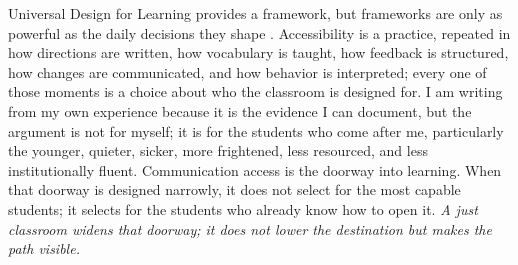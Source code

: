 \documentclass[11pt]{article}
\begin{document}
Universal Design for Learning provides a framework, but frameworks are only as powerful as the daily decisions they shape \citep{cast2024udl}. Accessibility is a practice, repeated in how directions are written, how vocabulary is taught, how feedback is structured, how changes are communicated, and how behavior is interpreted; every one of those moments is a choice about who the classroom is designed for. I am writing from my own experience because it is the evidence I can document, but the argument is not for myself; it is for the students who come after me, particularly the younger, quieter, sicker, more frightened, less resourced, and less institutionally fluent. Communication access is the doorway into learning. When that doorway is designed narrowly, it does not select for the most capable students; it selects for the students who already know how to open it. \textit{A just classroom widens that doorway; it does not lower the destination but makes the path visible.}

\newpage


\end{document}
